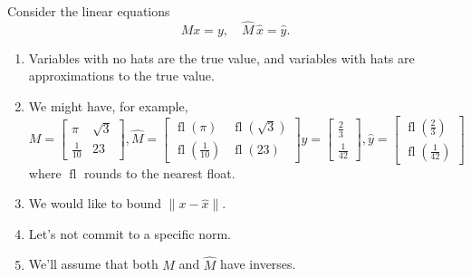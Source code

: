 \documentclass[usenames,dvipsnames,fleqn]{beamer}
\DeclareMathOperator{\fl}{fl}
\theoremstyle{definition}
\begin{document}
\begin{frame}
Consider the linear equations
\[
   M x = y, \quad \widehat M  \, \widehat x = \widehat y.
\]

\begin{enumerate}

\item Variables with no hats are the true value, and variables with hats are approximations to the true value.

\item We might have, for example,
\[
   M = \begin{bmatrix} \pi & \sqrt{3} \\ \frac{1}{10} & 23 \end{bmatrix},  
   \widehat M =   \begin{bmatrix} \fl(\pi) & \fl(\sqrt{3}) \\ \fl(\frac{1}{10}) & \fl(23) \end{bmatrix}
   y = \begin{bmatrix} \frac{2}{3} \\ \frac{1}{42} \end{bmatrix}, 
   \widehat y = \begin{bmatrix} \fl(\frac{2}{3}) \\ \fl(\frac{1}{42}) \end{bmatrix} 
   \]
where \(\fl\) rounds to the nearest float.

\item We would like to bound \( \| x - \widehat x \| \).

\item Let's not commit to a specific norm.

\item We'll assume that both \(M\) and \(\widehat M \) have inverses.
\end{enumerate}

\end{frame}
\end{document}

